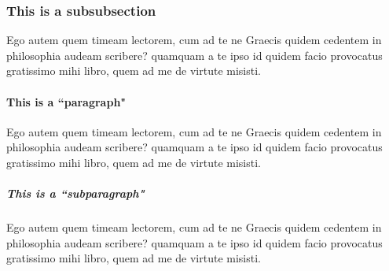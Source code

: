 \subsubsection{This is a subsubsection}
Ego autem quem timeam lectorem, cum ad te ne Graecis quidem cedentem in philosophia audeam scribere? quamquam a te ipso id quidem facio provocatus gratissimo mihi libro, quem ad me de virtute misisti. 

\paragraph{This is a ``paragraph"}
Ego autem quem timeam lectorem, cum ad te ne Graecis quidem cedentem in philosophia audeam scribere? quamquam a te ipso id quidem facio provocatus gratissimo mihi libro, quem ad me de virtute misisti. 

\subparagraph{This is a ``subparagraph"}
Ego autem quem timeam lectorem, cum ad te ne Graecis quidem cedentem in philosophia audeam scribere? quamquam a te ipso id quidem facio provocatus gratissimo mihi libro, quem ad me de virtute misisti. 
